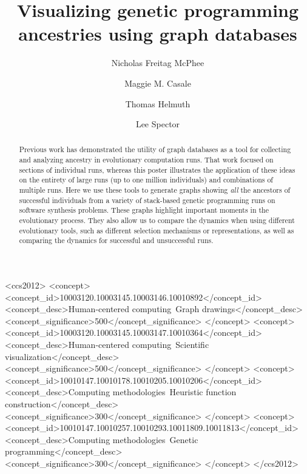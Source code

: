 \documentclass[sigconf]{acmart}
\begin{document}
\title{Visualizing genetic programming ancestries using graph databases}

\author{Nicholas Freitag McPhee}

\author{Maggie M. Casale}

\author{Thomas Helmuth}

\author{Lee Spector}

\begin{abstract}

Previous work has demonstrated the utility of graph databases as a tool for collecting and analyzing ancestry in evolutionary computation runs. That work focused on sections of individual runs, whereas this poster illustrates the application of these ideas on the entirety of large runs (up to one million individuals) and combinations of multiple runs.
Here we use these tools to generate graphs showing \emph{all} the ancestors of successful individuals from a variety of stack-based genetic programming runs on software synthesis problems. These graphs highlight important moments in the evolutionary process. They also allow us to compare the dynamics when using different evolutionary tools, such as different selection mechanisms or representations, as well as comparing the dynamics for successful and unsuccessful runs.

\end{abstract}

\begin{CCSXML}
	<ccs2012>
	<concept>
	<concept_id>10003120.10003145.10003146.10010892</concept_id>
	<concept_desc>Human-centered computing~Graph drawings</concept_desc>
	<concept_significance>500</concept_significance>
	</concept>
	<concept>
	<concept_id>10003120.10003145.10003147.10010364</concept_id>
	<concept_desc>Human-centered computing~Scientific visualization</concept_desc>
	<concept_significance>500</concept_significance>
	</concept>
	<concept>
	<concept_id>10010147.10010178.10010205.10010206</concept_id>
	<concept_desc>Computing methodologies~Heuristic function construction</concept_desc>
	<concept_significance>300</concept_significance>
	</concept>
	<concept>
	<concept_id>10010147.10010257.10010293.10011809.10011813</concept_id>
	<concept_desc>Computing methodologies~Genetic programming</concept_desc>
	<concept_significance>300</concept_significance>
	</concept>
	</ccs2012>
\end{CCSXML}
\end{document}
